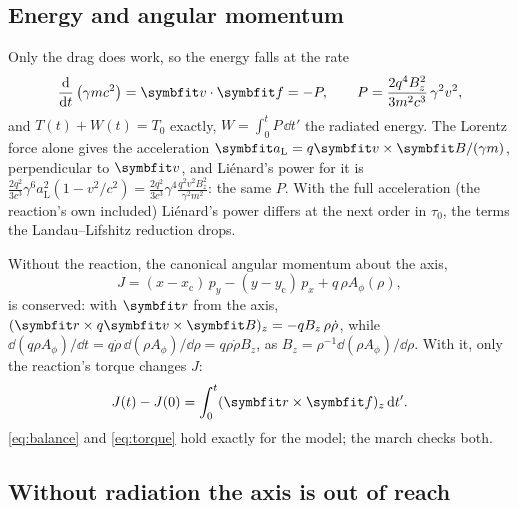 \documentclass{leveldoc}
\begin{document}
\subsection{Energy and angular momentum}\label{sec:balances}

Only the drag does work, so the energy falls at the rate
\begin{equation}\label{eq:balance}
  \deriv{}{t}\left(\gamma mc^2\right) = \vect{v}\cdot\vect{f} = -P,
  \qquad P = \frac{2q^4B_z^2}{3m^2c^3}\,\gamma^2v^2,
\end{equation}
and $T(t) + W(t) = T_0$ exactly, $W = \int_0^t P\,\dd t'$ the radiated energy. The Lorentz force
alone gives the acceleration $\vect{a}_\mathrm{L} = q\vect{v}\times\vect{B}/(\gamma m)$,
perpendicular to $\vect{v}$, and Liénard's power  for it is
$\frac{2q^2}{3c^3}\gamma^6 a_\mathrm{L}^2(1 - v^2/c^2) = \frac{2q^2}{3c^3}\gamma^4\frac{q^2v^2B_z^2}{\gamma^2m^2}$:
the same $P$. With the full acceleration (the reaction's own included) Liénard's power differs at
the next order in $\tau_0$, the terms the Landau--Lifshitz reduction drops.

Without the reaction, the canonical angular momentum about the axis,
\begin{equation}\label{eq:canonical}
  J = (x - x_\mathrm{c})\,p_y - (y - y_\mathrm{c})\,p_x + q\,\rho A_\phi(\rho),
\end{equation}
is conserved: with $\vect{r}$ from the axis, $(\vect{r}\times q\vect{v}\times\vect{B})_z = -qB_z\,\rho\dot\rho$,
while $\dd(q\rho A_\phi)/\dd t = q\dot\rho\,\dd(\rho A_\phi)/\dd\rho = q\rho\dot\rho B_z$, as
$B_z = \rho^{-1}\dd(\rho A_\phi)/\dd\rho$. With it, only the reaction's torque changes $J$:
\begin{equation}\label{eq:torque}
  J(t) - J(0) = \int_0^t (\vect{r}\times\vect{f})_z\,\dd t'.
\end{equation}
\eqref{eq:balance} and \eqref{eq:torque} hold exactly for the model; the march checks both.

\subsection{Without radiation the axis is out of reach}\label{sec:bound}
\end{document}
